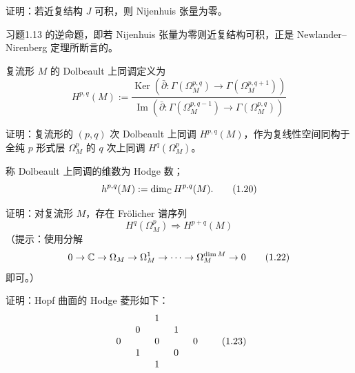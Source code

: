 \begin{exercise}
证明：若近复结构 $J$ 可积，则 Nijenhuis 张量为零。
\end{exercise}

习题1.13 的逆命题，即若 Nijenhuis 张量为零则近复结构可积，正是 Newlander–Nirenberg 定理所断言的。

\begin{definition}
复流形 $M$ 的 Dolbeault 上同调定义为
\begin{equation}
    H^{p,q}(M) := \frac{\operatorname{Ker}\left(\bar\partial\colon\Gamma\left(\Omega^{p,q}_M\right)\to\Gamma\left(\Omega^{p,q+1}_M\right)\right)}{\operatorname{Im}\left(\bar\partial\colon\Gamma\left(\Omega^{p,q-1}_M\right)\to\Gamma\left(\Omega^{p,q}_M\right)\right)} \tag{1.19}
\end{equation}
\end{definition}

\begin{exercise}[Dolbeault 定理]
证明：复流形的 $(p,q)$ 次 Dolbeault 上同调 $H^{p,q}(M)$，作为复线性空间同构于全纯 $p$ 形式层 $\Omega^p_M$ 的 $q$ 次上同调 $H^q(\Omega^p_M)$。
\end{exercise}

\begin{definition}
称 Dolbeault 上同调的维数为 Hodge 数；
\begin{equation}
    h^{p,q}(M) := \dim_{\mathbb{C}} H^{p,q}(M). \tag{1.20}
\end{equation}
\end{definition}

\begin{exercise}
证明：对复流形 $M$，存在 Frölicher 谱序列
\begin{equation}
    H^q(\Omega^p_M) \Rightarrow H^{p+q}(M) \tag{1.21}
\end{equation}
（提示：使用分解
\begin{equation}
    0 \to \mathbb{C} \to \Omega_M \to \Omega^1_M \to \cdots \to \Omega^{\dim M}_M \to 0 \tag{1.22}
\end{equation}
即可。）
\end{exercise}

\begin{exercise}
证明：Hopf 曲面的 Hodge 菱形如下：
\begin{equation}
    \begin{array}{c@{\hspace{1.5em}}c@{\hspace{1.5em}}c@{\hspace{1.5em}}c@{\hspace{1.5em}}c}
        & & 1 & & \\
        & 0 & & 1 & \\
        0 & & 0 & & 0 \\
        & 1 & & 0 & \\
        & & 1 & &
    \end{array}
    \tag{1.23}
\end{equation}
\end{exercise}

